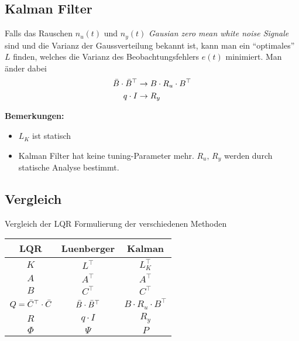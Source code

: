 \subsection{Kalman Filter}
    Falls das Rauschen $n_u(t)$ und $n_y(t)$ \emph{Gausian zero mean white noise Signale} sind und die Varianz der Gaussverteilung bekannt ist, kann man ein ``optimales'' $L$ finden, welches die Varianz des Beobachtungsfehlers $e(t)$ minimiert. Man änder dabei
    \begin{align*}
        \Bar{B}\cdot\Bar{B}^\top &\rightarrow B\cdot R_u \cdot B^\top\\
        q\cdot I &\rightarrow R_y
    \end{align*}
    
    \textbf{Bemerkungen:}
    \begin{itemize}
        \item $L_K$ ist statisch
        \item Kalman Filter hat keine tuning-Parameter mehr. $R_u,\, R_y$ werden durch statische Analyse bestimmt.
    \end{itemize}
    
    \subsection{Vergleich}
        Vergleich der LQR Formulierung der verschiedenen Methoden
        \begin{center}
            {\renewcommand{\arraystretch}{1.4}
            \begin{tabular}{c|c|c}
                LQR &   Luenberger  &   Kalman  \\
                \hline
                $K$ &   $L^\top$    &   $L^\top_K$\\
                \hline
                $A$ &   $A^\top$    &   $A^\top$\\
                $B$ &   $C^\top$    &   $C^\top$\\
                $Q = \Bar{C}^\top\cdot\Bar{C}$  &   $\Bar{B}\cdot\Bar{B}^\top$    &   $B\cdot R_u  \cdot B^\top$\\
                $R$ & $q\cdot I$    &   $R_y$\\
                $\Phi$ & $\Psi$     &   $P$
            \end{tabular}
            }
        \end{center}
